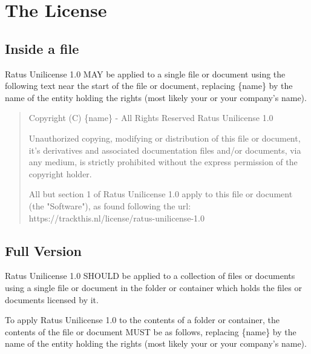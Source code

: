 \documentclass[a4paper,11pt]{article}
\begin{document}
\newpage
\section{The License}

\subsection{Inside a file}
  Ratus Unilicense 1.0 MAY be applied to a single file or document using the
  following text near the start of the file or document, replacing \{name\} by
  the name of the entity holding the rights (most likely your or your company's
  name).

  \begin{quote}
    Copyright (C) \{name\} - All Rights Reserved\newline
    Ratus Unilicense 1.0

    Unauthorized copying, modifying or distribution of this file or document,
    it's derivatives and associated documentation files and/or documents, via
    any medium, is strictly prohibited without the express permission of the
    copyright holder.

    All but section 1 of Ratus Unilicense 1.0 apply to this file or
    document (the "Software"), as found following the url:
    https://trackthis.nl/license/ratus-unilicense-1.0
  \end{quote}

\newpage
\subsection{Full Version}
  Ratus Unilicense 1.0 SHOULD be applied to a collection of files or documents
  using a single  file or document in the folder or container
  which holds the files or documents licensed by it.

  To apply Ratus Unilicense 1.0 to the contents of a folder or container, the
  contents of the  file or document MUST be as follows,
  replacing \{name\} by the name of the entity holding the rights (most likely
  your or your company's name).
\end{document}
